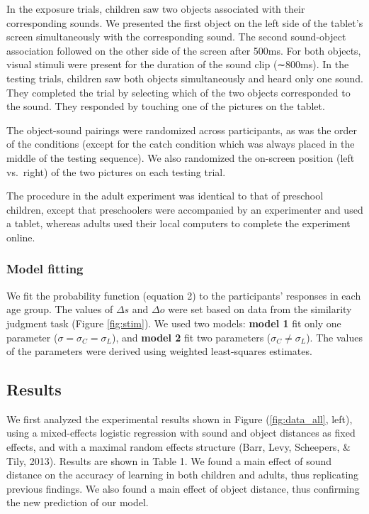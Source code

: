 \documentclass[10pt, letterpaper]{article}
\begin{document}
In the exposure trials, children saw two objects associated with their
corresponding sounds. We presented the first object on the left side of
the tablet's screen simultaneously with the corresponding sound. The
second sound-object association followed on the other side of the screen
after 500ms. For both objects, visual stimuli were present for the
duration of the sound clip (∼800ms). In the testing trials, children saw
both objects simultaneously and heard only one sound. They completed the
trial by selecting which of the two objects corresponded to the sound.
They responded by touching one of the pictures on the tablet.

The object-sound pairings were randomized across participants, as was
the order of the conditions (except for the catch condition which was
always placed in the middle of the testing sequence). We also randomized
the on-screen position (left vs.~right) of the two pictures on each
testing trial.

The procedure in the adult experiment was identical to that of preschool
children, except that preschoolers were accompanied by an experimenter
and used a tablet, whereas adults used their local computers to complete
the experiment online.

\subsubsection{Model fitting}\label{model-fitting}

We fit the probability function (equation 2) to the participants'
responses in each age group. The values of \(\Delta s\) and \(\Delta o\)
were set based on data from the similarity judgment task (Figure
\ref{fig:stim}). We used two models: \textbf{model 1} fit only one
parameter (\(\sigma = \sigma_C =\sigma_L\)), and \textbf{model 2} fit
two parameters (\(\sigma_C \neq \sigma_L\)). The values of the
parameters were derived using weighted least-squares estimates.

\subsection{Results}\label{results}

We first analyzed the experimental results shown in Figure
(\ref{fig:data_all}, left), using a mixed-effects logistic regression
with sound and object distances as fixed effects, and with a maximal
random effects structure (Barr, Levy, Scheepers, \& Tily, 2013). Results
are shown in Table 1. We found a main effect of sound distance on the
accuracy of learning in both children and adults, thus replicating
previous findings. We also found a main effect of object distance, thus
confirming the new prediction of our model.
\end{document}
